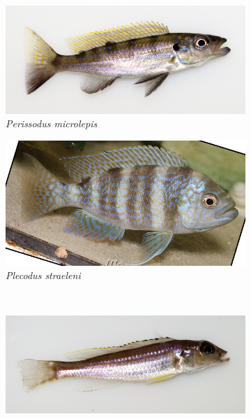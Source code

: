 \begin{figure}
\begin{subfigure}[t]{\fishfigwidth}
    \end{subfigure}
    \begin{subfigure}[t]{\fishfigwidth}
        \includegraphics[width=\fishfigwidth]{figures/host_phenotypes/Perissodus_microlepis}
        \small
        \caption{\textit{Perissodus microlepis}}
    \end{subfigure}
    \begin{subfigure}[t]{\fishfigwidth}
        \includegraphics[width=\fishfigwidth]{figures/host_phenotypes/Plecodus_straeleni}
        \small
        \caption{\textit{Plecodus straeleni}} 
    \end{subfigure} \\
    \begin{subfigure}[t]{\fishfigwidth}
        \includegraphics[width=\fishfigwidth]{figures/host_phenotypes/Reganochromis_calliurus}

\end{subfigure}
\end{figure}

